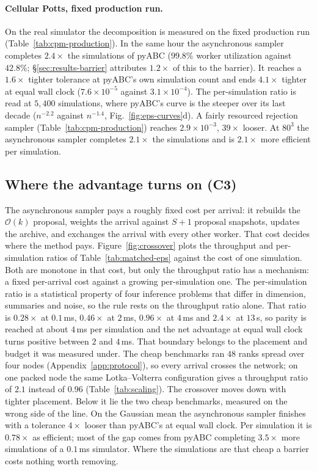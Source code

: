 \documentclass[pdflatex,sn-mathphys-num]{sn-jnl}
\theoremstyle{plain}
\theoremstyle{definition}
\begin{document}
\paragraph{Cellular Potts, fixed production run.} On the real simulator the decomposition is measured on the fixed production run (Table~\ref{tab:cpm-production}). In the same hour the asynchronous sampler completes $2.4\times$ the simulations of pyABC ($99.8\%$ worker utilization against $42.8\%$; \S\ref{sec:results-barrier} attributes $1.2\times$ of this to the barrier). It reaches a $1.6\times$ tighter tolerance at pyABC's own simulation count and ends $4.1\times$ tighter at equal wall clock ($7.6\times10^{-5}$ against $3.1\times10^{-4}$). The per-simulation ratio is read at $5{,}400$ simulations, where pyABC's curve is the steeper over its last decade ($n^{-2.2}$ against $n^{-1.4}$, Fig.~\ref{fig:eps-curves}d). A fairly resourced rejection sampler (Table~\ref{tab:cpm-production}) reaches $2.9\times10^{-3}$, $39\times$ looser. At $80^3$ the asynchronous sampler completes $2.1\times$ the simulations and is $2.1\times$ more efficient per simulation.

\subsection{Where the advantage turns on (C3)}\label{sec:results-boundary}

The asynchronous sampler pays a roughly fixed cost per arrival: it rebuilds the $\mathcal{O}(k)$ proposal, weights the arrival against $S{+}1$ proposal snapshots, updates the archive, and exchanges the arrival with every other worker. That cost decides where the method pays. Figure~\ref{fig:crossover} plots the throughput and per-simulation ratios of Table~\ref{tab:matched-eps} against the cost of one simulation. Both are monotone in that cost, but only the throughput ratio has a mechanism: a fixed per-arrival cost against a growing per-simulation one. The per-simulation ratio is a statistical property of four inference problems that differ in dimension, summaries and noise, so the rule rests on the throughput ratio alone. That ratio is $0.28\times$ at $0.1$\,ms, $0.46\times$ at $2$\,ms, $0.96\times$ at $4$\,ms and $2.4\times$ at $13$\,s, so parity is reached at about $4$\,ms per simulation and the net advantage at equal wall clock turns positive between $2$ and $4$\,ms. That boundary belongs to the placement and budget it was measured under. The cheap benchmarks ran $48$ ranks spread over four nodes (Appendix~\ref{app:protocol}), so every arrival crosses the network; on one packed node the same Lotka--Volterra configuration gives a throughput ratio of $2.1$ instead of $0.96$ (Table~\ref{tab:scaling}). The crossover moves down with tighter placement. Below it lie the two cheap benchmarks, measured on the wrong side of the line. On the Gaussian mean the asynchronous sampler finishes with a tolerance $4\times$ looser than pyABC's at equal wall clock. Per simulation it is $0.78\times$ as efficient; most of the gap comes from pyABC completing $3.5\times$ more simulations of a $0.1$\,ms simulator. Where the simulations are that cheap a barrier costs nothing worth removing.
\end{document}
